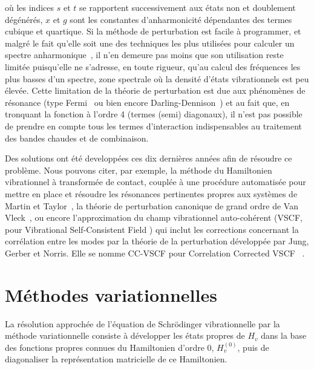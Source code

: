 \noindent où les indices $s$ et $t$ se rapportent successivement aux états non et doublement dégénérés, $x$ et $g$ sont les constantes d'anharmonicité dépendantes des termes cubique et quartique. Si la méthode de perturbation est facile à programmer, et malgré le fait qu'elle soit une des techniques les plus utilisées pour calculer un spectre anharmonique~\cite{frisch2015gaussian}, il n'en demeure pas moins que son utilisation reste limitée puisqu'elle ne s'adresse, en toute rigueur, qu'au calcul des fréquences les plus basses d'un spectre, zone spectrale où la densité d'états vibrationnels est peu élevée. Cette limitation de la théorie de perturbation est due aux phénomènes de résonance (type Fermi~\cite{fermi1931ramaneffekt} ou bien encore Darling-Dennison~\cite{darling1940water}) et au fait que, en tronquant la fonction à l'ordre 4 (termes (semi) diagonaux), il n'est pas possible de prendre en compte tous les termes d'interaction indispensables au traitement des bandes chaudes et de combinaison.

Des solutions ont été developpées ces dix dernières années afin de résoudre ce problème. Nous pouvons citer, par exemple, la méthode du Hamiltonien vibrationnel à transformée de contact, couplée à une procédure automatisée pour mettre en place et résoudre les résonances pertinentes propres aux systèmes de Martin et Taylor~\cite{martin1997accurate}, la théorie de perturbation canonique de grand ordre de Van Vleck~\cite{nielsen1951vibration}, ou encore l'approximation du champ vibrationnel auto-cohérent (VSCF, pour \og Vibrational Self-Consistent Field \fg{}) qui inclut les corrections concernant la corrélation entre les modes par la théorie de la perturbation développée par Jung, Gerber et Norris. Elle se nomme CC-VSCF pour \og Correlation Corrected VSCF \fg ~\cite{jung1996vibrational,norris1996mo}. 


\section{Méthodes variationnelles}\label{methodesvariationnelles}

La résolution approchée de l'équation de Schr\"{o}dinger vibrationnelle par la méthode variationnelle consiste à développer les états propres de $H_v$ dans la base des fonctions propres connues du Hamiltonien d'ordre 0, $H^{(0)}_v$, puis de diagonaliser la représentation matricielle de ce Hamiltonien. 

